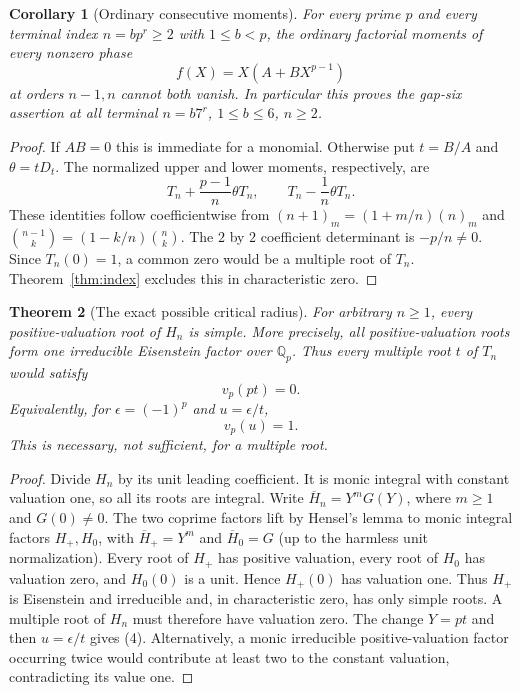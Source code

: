 \documentclass[11pt]{article}
\newtheorem{theorem}{Theorem}
\newtheorem{corollary}[theorem]{Corollary}
\begin{document}
\begin{corollary}[Ordinary consecutive moments]\label{cor:pair}
For every prime $p$ and every terminal index $n=bp^r\ge2$ with
$1\le b<p$, the ordinary factorial moments of every nonzero phase
\[
 f(X)=X(A+BX^{p-1})
\]
at orders $n-1,n$ cannot both vanish. In particular this proves
the gap-six assertion at all terminal $n=b7^r$,
$1\le b\le6$, $n\ge2$.
\end{corollary}
\begin{proof}
If $A B=0$ this is immediate for a monomial. Otherwise put
$t=B/A$ and $\theta=tD_t$. The normalized upper and lower
moments, respectively, are
\[
 T_n+\frac{p-1}{n}\theta T_n,\qquad
 T_n-\frac1n\theta T_n.
\]
These identities follow coefficientwise from
$(n+1)_m=(1+m/n)(n)_m$ and
$\binom{n-1}{k}=(1-k/n)\binom nk$.
The $2$ by $2$ coefficient determinant is $-p/n\ne0$.
Since $T_n(0)=1$, a common zero would be a multiple root of
$T_n$. Theorem~\ref{thm:index} excludes this in characteristic zero.
\end{proof}

\begin{theorem}[The exact possible critical radius]\label{thm:radius}
For arbitrary $n\ge1$, every positive-valuation root of $H_n$
is simple. More precisely, all positive-valuation roots form one
irreducible Eisenstein factor over $\mathbb Q_p$.
Thus every multiple root $t$ of $T_n$ would satisfy
\[
 v_p(pt)=0.
\]
Equivalently, for $\epsilon=(-1)^p$ and $u=\epsilon/t$,
\[
                         v_p(u)=1.                       \tag{4}
\]
This is necessary, not sufficient, for a multiple root.
\end{theorem}
\begin{proof}
Divide $H_n$ by its unit leading coefficient. It is monic
integral with constant valuation one, so all its roots are
integral. Write
$\overline H_n=Y^m G(Y)$, where $m\ge1$ and $G(0)\ne0$.
The two coprime factors lift by Hensel's lemma to monic integral
factors $H_+,H_0$, with $\overline H_+=Y^m$ and
$\overline H_0=G$ (up to the harmless unit normalization).
Every root of $H_+$ has positive valuation, every root of $H_0$
has valuation zero, and $H_0(0)$ is a unit. Hence $H_+(0)$ has
valuation one. Thus $H_+$ is Eisenstein and irreducible and,
in characteristic zero, has only simple roots.
A multiple root of $H_n$ must therefore have valuation zero.
The change $Y=pt$ and then $u=\epsilon/t$ gives (4).
Alternatively, a monic irreducible positive-valuation factor
occurring twice would contribute at least two to the constant
valuation, contradicting its value one.
\end{proof}
\end{document}
